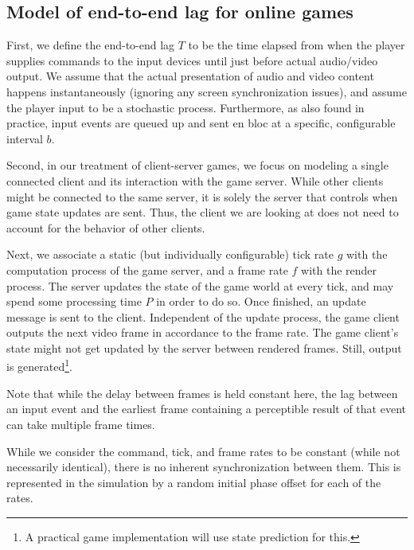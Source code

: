 \subsection{Model of end-to-end lag for online games}
First, we define the end-to-end lag $T$ to be the time elapsed 
from when the player supplies commands to the input devices until just 
before actual audio/video output.
We assume that the actual presentation of 
audio and video content happens instantaneously  
(ignoring any screen synchronization issues), and assume the player 
input to be a stochastic process. %
Furthermore, as also found in practice, input events are queued up  
and sent en bloc at a specific, configurable interval $b$.

Second, in our treatment of client-server games, we focus on modeling 
a single connected client and its interaction with the game server. 
While other clients might be connected to the same server, it is 
solely the server that controls when game state updates are sent. 
Thus, the client we are looking at does not need to account for the 
behavior of other clients.

Next, we associate a static (but individually configurable) tick 
rate $g$ with the computation process of the game server, and a frame rate $f$
with the render process. 
The server updates the state of the game world at every tick, and may 
spend some processing time $P$ in order to do so.  Once finished, an update 
message is sent to the client.
Independent of the update process, the game client outputs the next 
video frame in accordance to the frame rate. The game client's state 
might not get updated by the server between rendered frames. Still, 
output is generated\footnote{A practical game implementation will use state prediction for this.}.

Note that while the delay between frames is held constant here,
the lag between an input event and the earliest frame containing a perceptible 
result of that event can take multiple frame times.

While we consider the command, tick, and frame rates to be constant 
(while not necessarily identical), there is no inherent synchronization 
between them. This is represented in the simulation by a random initial 
phase offset for each of the rates.

